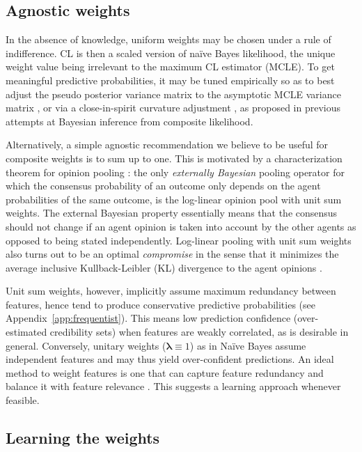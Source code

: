 \documentclass[english]{scrartcl}
\newcommand{\blambda}{{\boldsymbol{\lambda}}}
\begin{document}
\subsection{Agnostic weights}

In the absence of knowledge, uniform weights may be chosen under a rule of indifference. CL is then a scaled version of na\"ive Bayes likelihood, the unique weight value being irrelevant to the maximum CL estimator (MCLE). To get meaningful predictive probabilities, it may be tuned empirically so as to best adjust the pseudo posterior variance matrix to the asymptotic MCLE variance matrix \cite{Pauli-11}, or via a close-in-spirit curvature adjustment \cite{Ribatet-12}, as proposed in previous attempts at Bayesian inference from composite likelihood. 

Alternatively, a simple agnostic recommendation we believe to be useful for composite weights is to sum up to one. This is motivated by a characterization theorem for opinion pooling \cite{Genest-86,Genest-86b}: the only {\em externally Bayesian} pooling operator for which the consensus probability of an outcome only depends on the agent probabilities of the same outcome, is the log-linear opinion pool with unit sum weights. The external Bayesian property essentially means that the consensus should not change if an agent opinion is taken into account by the other agents as opposed to being stated independently. Log-linear pooling with unit sum weights also turns out to be an optimal {\em compromise} in the sense that it minimizes the average inclusive Kullback-Leibler (KL) divergence to the agent opinions \cite{Garg-04}. 

Unit sum weights, however, implicitly assume maximum redundancy between features, hence tend to produce conservative predictive probabilities (see Appendix~\ref{app:frequentist}). This means low prediction confidence (over-estimated credibility sets) when features are weakly correlated, as is desirable in general. Conversely, unitary weights ($\blambda\equiv 1$) as in Na\"ive Bayes assume independent features and may thus yield over-confident predictions. An ideal method to weight features is one that can capture feature redundancy and balance it with feature relevance \cite{Peng-05}. This suggests a learning approach whenever feasible.


\subsection{Learning the weights}
\label{sec:learning}
\end{document}
